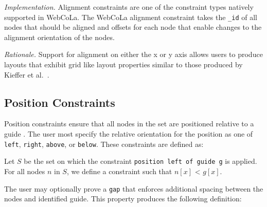 \emph{Implementation.}
Alignment constraints are one of the constraint types natively supported in
WebCoLa. The WebCoLa alignment constraint takes the \texttt{\_id} of all nodes
that should be aligned and offsets for each node that enable changes to the
alignment orientation of the nodes.

\emph{Rationale.} Support for alignment on either the x or y axis allows
users to produce layouts that exhibit grid like layout properties similar
to those produced by Kieffer et al.\ \cite{kieffer2016hola}.



\subsection{Position Constraints}
Position constraints ensure that all nodes in the set are positioned relative to
a guide . The user most specify the relative
orientation for the position as one of \texttt{left}, \texttt{right}, 
\texttt{above}, or \texttt{below}. These constraints are defined as:

\begin{definition}
Let $S$ be the set on which the constraint \texttt{position left of guide g} is applied.
For all nodes $n$ in $S$, we define a constraint such that $n[x]$ < $g[x]$.
\end{definition}

The user may optionally prove a \texttt{gap} that enforces additional spacing
between the nodes and identified guide. This property produces the following
definition:

